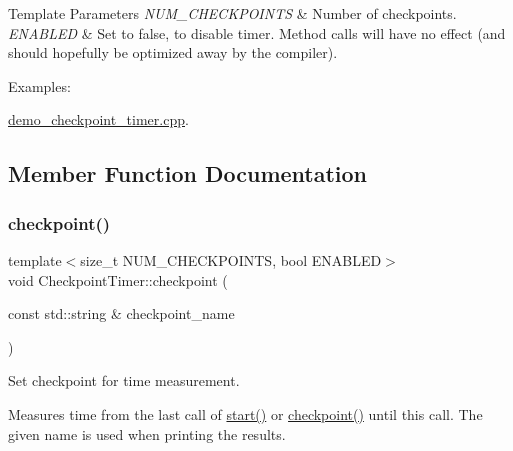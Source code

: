 \begin{DoxyTemplParams}{Template Parameters}
{\em N\+U\+M\+\_\+\+C\+H\+E\+C\+K\+P\+O\+I\+N\+TS} & Number of checkpoints. \\
\hline
{\em E\+N\+A\+B\+L\+ED} & Set to false, to disable timer. Method calls will have no effect (and should hopefully be optimized away by the compiler). \\
\hline
\end{DoxyTemplParams}
\begin{Desc}
\item[Examples\+: ]\par
\hyperlink{demo_checkpoint_timer_8cpp-example}{demo\+\_\+checkpoint\+\_\+timer.\+cpp}.\end{Desc}


\subsection{Member Function Documentation}
\mbox{\label{classreal__time__tools_1_1CheckpointTimer_a6e91b61b72c433a220b1bddb7a634bf5}} 
\subsubsection{\texorpdfstring{checkpoint()}{checkpoint()}}
{\footnotesize\ttfamily template$<$size\+\_\+t N\+U\+M\+\_\+\+C\+H\+E\+C\+K\+P\+O\+I\+N\+TS, bool E\+N\+A\+B\+L\+ED$>$ \\
void Checkpoint\+Timer\+::checkpoint (\begin{DoxyParamCaption}\item[{const std\+::string \&}]{checkpoint\+\_\+name }\end{DoxyParamCaption})}



Set checkpoint for time measurement. 

Measures time from the last call of \hyperlink{classreal__time__tools_1_1CheckpointTimer_ad93a12cb74103528c8db4e7b1745eae6}{start()} or \hyperlink{classreal__time__tools_1_1CheckpointTimer_a6e91b61b72c433a220b1bddb7a634bf5}{checkpoint()} until this call. The given name is used when printing the results.


